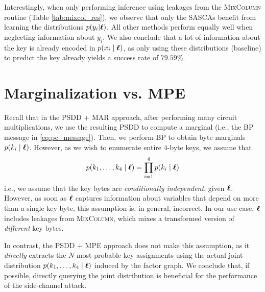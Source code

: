 Interestingly, when only performing inference using leakages from the \textsc{MixColumn} routine (Table \ref{tab:mixcol_res}), we observe that only the SASCAs benefit from learning the distributions $p(y_i | \boldsymbol{\ell})$. All other methods perform equally well when neglecting information about $y_i$. We also conclude that a lot of information about the key is already encoded in $p(x_i \mid \boldsymbol{\ell})$, as only using these distributions (baseline) to predict the key already yields a success rate of $79.59 \%$.


\section{Marginalization vs. MPE}
\label{sec:mar_vs_mpe}
Recall that in the PSDD + MAR approach, after performing many circuit multiplications, we use the resulting PSDD to compute a marginal (i.e., the BP message in \ref{eq:pc_message}). Then, we perform BP to obtain byte marginals $p(k_i \mid \boldsymbol{\ell})$. However, as we wish to enumerate entire $4$-byte keys, we assume that
\begin{align}
    p(k_1,\dots,k_4 \mid \boldsymbol{\ell}) = \prod_{i=1}^4 p(k_i \mid \boldsymbol{\ell})
\end{align}
i.e., we assume that the key bytes are \emph{conditionally independent}, given $\boldsymbol{\ell}$. However, as soon as $\boldsymbol{\ell}$ captures information about variables that depend on more than a single key byte, this assumption is, in general, incorrect. In our use case, $\boldsymbol{\ell}$ includes leakages from \textsc{MixColumn}, which mixes a transformed version of \emph{different} key bytes. 

In contrast, the PSDD + MPE approach does not make this assumption, as it \emph{directly} extracts the $N$ most probable key assignments using the actual joint distribution $p(k_1,\dots,k_4 \mid \boldsymbol{\ell})$ induced by the factor graph. We conclude that, if possible, directly querying the joint distribution is beneficial for the performance of the side-channel attack.

